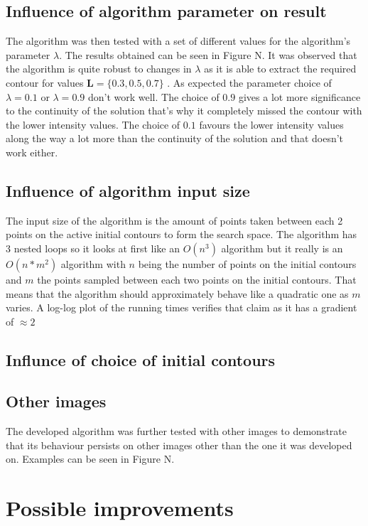 \documentclass[a4paper,12pt]{article}
\begin{document}
\subsection{Influence of algorithm parameter on result}
The algorithm was then tested with a set of different values for the algorithm's parameter $\lambda$. The results obtained can be seen in Figure N. It was observed that the algorithm is quite robust to changes in $\lambda$ as it is able to extract the required contour for values $\mathbf{L}=\{0.3, 0.5, 0.7\}$ . As expected the parameter choice of $\lambda=0.1$ or $\lambda=0.9$ don't work well. The choice of $0.9$ gives a lot more significance to the continuity of the solution that's why it completely missed the contour with the lower intensity values. The choice of $0.1$ favours the lower intensity values along the way a lot more than the continuity of the solution and that doesn't work either.
\subsection{Influence of algorithm input size}
The input size of the algorithm is the amount of points taken between each 2 points on the active initial contours to form the search space. The algorithm has 3 nested loops so it looks at first like an $O(n^3)$ algorithm but it really is an $O(n * m^2)$ algorithm with $n$ being the number of points on the initial contours and $m$ the points sampled between each two points on the initial contours. That means that the algorithm should approximately behave like a quadratic one as $m$ varies. A log-log plot of the running times verifies that claim as it has a gradient of $\approx 2$
\subsection{Influnce of choice of initial contours}
\subsection{Other images}
The developed algorithm was further tested with other images to demonstrate that its behaviour persists on other images other than the one it was developed on. Examples can be seen in Figure N.
\section{Possible improvements}
\end{document}

